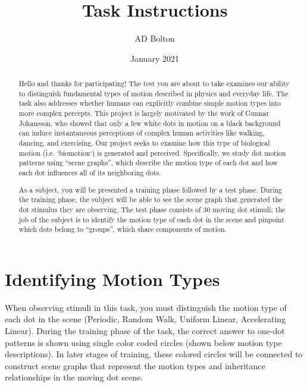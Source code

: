 \documentclass{scrartcl}
\title{Task Instructions}
\author{AD Bolton}
\date{January 2021}
\begin{document}
\maketitle

\begin{abstract}

  Hello and thanks for participating! The test you are about to take examines our ability to distinguish fundamental types of motion described in physics and everyday life. The task also addresses whether humans can explicitly combine simple motion types into more complex percepts. This project is largely motivated by the work of Gunnar Johansson, who showed that only a few white dots in motion on a black background can induce instantaneous perceptions of complex human activities like walking, dancing, and exercising. Our project seeks to examine how this type of biological motion (i.e. `biomotion`) is generated and perceived. Specifically, we study dot motion patterns using ``scene graphs'', which describe the motion type of each dot and how each dot influences all of its neighboring dots. 

   As a subject, you will be presented a training phase followed by a test phase. During the training phase, the subject will be able to see the scene graph that generated the dot stimulus they are observing. The test phase consists of 30 moving dot stimuli; the job of the subject is to identify the motion type of each dot in the scene and pinpoint which dots belong to ``groups'', which share components of motion. 

\end{abstract}

\section{Identifying Motion Types}

  When observing stimuli in this task, you must distinguish the motion type of each dot in the scene (Periodic, Random Walk, Uniform Linear, Accelerating Linear). During the training phase of the task, the correct answer to one-dot patterns is shown using single color coded circles (shown below motion type descriptions). In later stages of training, these colored circles will be connected to construct scene graphs that represent the motion types and inheritance relationships in the moving dot scene. 
\end{document}
